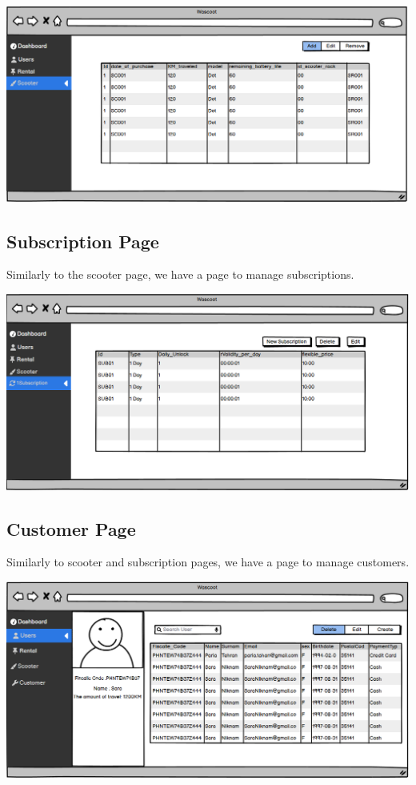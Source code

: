 \includegraphics[scale = 0.6]{sections/DLL/scooter-mockup.png}

\subsection{Subscription Page}

Similarly to the scooter page, we have a page to manage subscriptions.

\includegraphics[scale = 0.6]{sections/DLL/subscription-mockup.png}

\subsection{Customer Page}

Similarly to scooter and subscription pages, we have a page to manage customers.

\includegraphics[scale = 0.6]{sections/DLL/customers-mockup.png}